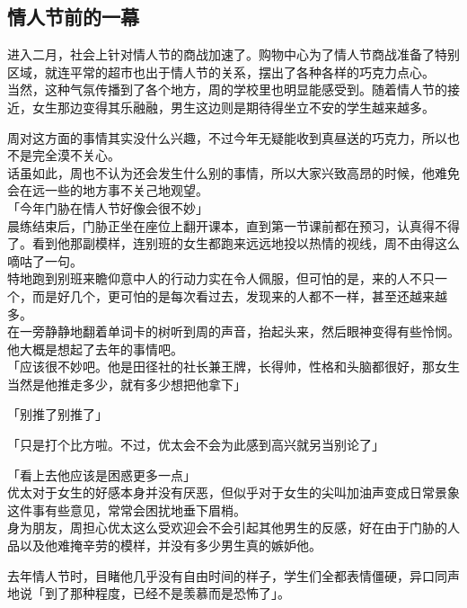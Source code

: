 \subsection{情人节前的一幕}

进入二月，社会上针对情人节的商战加速了。购物中心为了情人节商战准备了特别区域，就连平常的超市也出于情人节的关系，摆出了各种各样的巧克力点心。\\

当然，这种气氛传播到了各个地方，周的学校里也明显能感受到。随着情人节的接近，女生那边变得其乐融融，男生这边则是期待得坐立不安的学生越来越多。

周对这方面的事情其实没什么兴趣，不过今年无疑能收到真昼送的巧克力，所以也不是完全漠不关心。\\

话虽如此，周也不认为还会发生什么别的事情，所以大家兴致高昂的时候，他难免会在远一些的地方事不关己地观望。\\

「今年门胁在情人节好像会很不妙」\\

晨练结束后，门胁正坐在座位上翻开课本，直到第一节课前都在预习，认真得不得了。看到他那副模样，连别班的女生都跑来远远地投以热情的视线，周不由得这么嘀咕了一句。\\

特地跑到别班来瞻仰意中人的行动力实在令人佩服，但可怕的是，来的人不只一个，而是好几个，更可怕的是每次看过去，发现来的人都不一样，甚至还越来越多。\\

在一旁静静地翻着单词卡的树听到周的声音，抬起头来，然后眼神变得有些怜悯。他大概是想起了去年的事情吧。\\

「应该很不妙吧。他是田径社的社长兼王牌，长得帅，性格和头脑都很好，那女生当然是他推走多少，就有多少想把他拿下」

「别推了别推了」

「只是打个比方啦。不过，优太会不会为此感到高兴就另当别论了」

「看上去他应该是困惑更多一点」\\

优太对于女生的好感本身并没有厌恶，但似乎对于女生的尖叫加油声变成日常景象这件事有些意见，常常会困扰地垂下眉梢。\\

身为朋友，周担心优太这么受欢迎会不会引起其他男生的反感，好在由于门胁的人品以及他难掩辛劳的模样，并没有多少男生真的嫉妒他。

去年情人节时，目睹他几乎没有自由时间的样子，学生们全都表情僵硬，异口同声地说「到了那种程度，已经不是羡慕而是恐怖了」。\\

